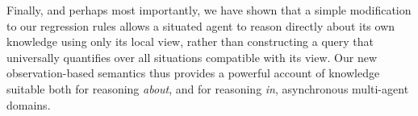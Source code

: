 Finally, and perhaps most importantly, we have shown that a simple
modification to our regression rules allows a situated agent to reason
directly about its own knowledge using only its local view, rather
than constructing a query that universally quantifies over all situations
compatible with its view. Our new observation-based semantics thus
provides a powerful account of knowledge suitable both for reasoning
\emph{about}, and for reasoning \emph{in}, asynchronous multi-agent
domains.

